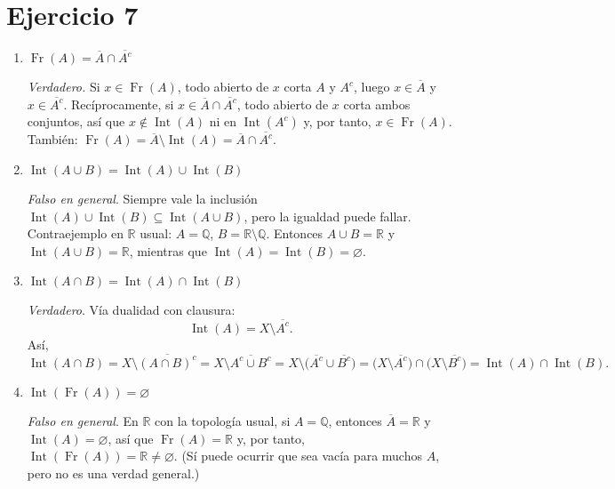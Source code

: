 \documentclass[12pt]{article}
\begin{document}
\section*{Ejercicio 7}
\begin{enumerate}

\item  $\displaystyle \operatorname{Fr}(A)=\overline{A}\cap\overline{A^c}$

\emph{Verdadero.} Si $x\in\operatorname{Fr}(A)$, todo abierto de $x$ corta $A$ y $A^c$,
luego $x\in\overline{A}$ y $x\in\overline{A^c}$. Recíprocamente,
si $x\in\overline{A}\cap\overline{A^c}$, todo abierto de $x$ corta ambos conjuntos,
así que $x\notin \operatorname{Int}(A)$ ni en $\operatorname{Int}(A^c)$ y, por tanto,
$x\in\operatorname{Fr}(A)$. También: 
\(\operatorname{Fr}(A)=\overline{A}\setminus \operatorname{Int}(A)=
\overline{A}\cap\overline{A^c}\).

\item  $\displaystyle \operatorname{Int}(A\cup B)=\operatorname{Int}(A)\cup\operatorname{Int}(B)$

\emph{Falso en general}. Siempre vale la inclusión
\(\operatorname{Int}(A)\cup\operatorname{Int}(B)\subseteq \operatorname{Int}(A\cup B)\),
pero la igualdad puede fallar. Contraejemplo en \(\mathbb{R}\) usual:
\(A=\mathbb{Q}\), \(B=\mathbb{R}\setminus\mathbb{Q}\).
Entonces \(A\cup B=\mathbb{R}\) y \(\operatorname{Int}(A\cup B)=\mathbb{R}\),
mientras que \(\operatorname{Int}(A)=\operatorname{Int}(B)=\varnothing\).

\item  $\displaystyle \operatorname{Int}(A\cap B)=\operatorname{Int}(A)\cap\operatorname{Int}(B)$

\emph{Verdadero}. Vía dualidad con clausura:
\[
\operatorname{Int}(A)=X\setminus\overline{A^c}.
\]
Así,
\[
\operatorname{Int}(A\cap B)=X\setminus\overline{(A\cap B)^c}
= X\setminus\overline{A^c\cup B^c}
= X\setminus\big(\overline{A^c}\cup\overline{B^c}\big)
= \big(X\setminus\overline{A^c}\big)\cap\big(X\setminus\overline{B^c}\big)
= \operatorname{Int}(A)\cap\operatorname{Int}(B).
\]

\item  $\displaystyle \operatorname{Int}(\operatorname{Fr}(A))=\varnothing$

\emph{Falso en general}. En \(\mathbb{R}\) con la topología usual, si \(A=\mathbb{Q}\),
entonces \(\overline{A}=\mathbb{R}\) y \(\operatorname{Int}(A)=\varnothing\),
así que \(\operatorname{Fr}(A)=\mathbb{R}\) y, por tanto,
\(\operatorname{Int}(\operatorname{Fr}(A))=\mathbb{R}\neq\varnothing\).
(Sí puede ocurrir que sea vacía para muchos \(A\), pero no es una verdad general.)
\end{enumerate}
\end{document}
